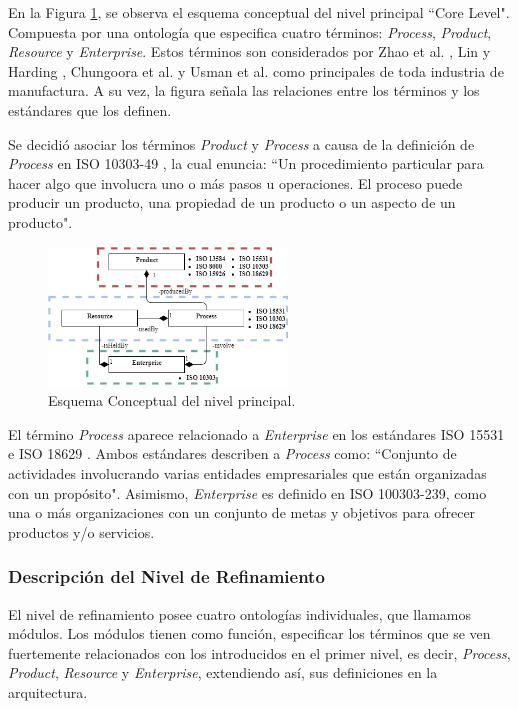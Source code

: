 \documentclass[journal]{IEEEtran}
\begin{document}
En la Figura \ref{fig3}, se observa el esquema conceptual del nivel principal ``Core Level". Compuesta por una ontolog\'ia que especifica cuatro t\'erminos: \emph{Process}, \emph{Product}, \emph{Resource} y \emph{Enterprise}. Estos t\'erminos son considerados por Zhao et al. \cite{Zhao1999}, Lin y Harding \cite{Lin2007},  Chungoora et al. \cite{Chungoora2013c} y Usman et al. \cite{Usman2013} como principales de toda industria de manufactura. A su vez, la figura señala las relaciones entre los t\'erminos y los est\'andares que los definen.

Se decidi\'o asociar los t\'erminos \emph{Product} y \emph{Process} a causa de la definici\'on de \emph{Process} en ISO 10303-49 \cite{ISOProperties}, la cual enuncia: ``Un procedimiento particular para hacer algo que involucra uno o m\'as pasos u operaciones. El proceso puede producir un producto, una propiedad de un producto o un aspecto de un producto". 

\begin{figure}[!t]
\centering
\includegraphics[width=2.5in]{figures/figure3.png}
\caption{Esquema Conceptual del nivel principal.}
\label{fig3}
\end{figure}

El t\'ermino \emph{Process} aparece relacionado a \emph{Enterprise} en los est\'andares ISO 15531 \cite{ISO2004} e ISO 18629 \cite{ISOPrinciplesc}. Ambos est\'andares describen a \emph{Process} como: ``Conjunto de actividades involucrando varias entidades empresariales que est\'an organizadas con un prop\'osito". Asimismo, \emph{Enterprise} es definido en ISO 100303-239, como una o m\'as organizaciones con un conjunto de metas y objetivos para ofrecer productos y/o servicios.

\subsubsection{Descripción del Nivel de Refinamiento}

El nivel de refinamiento posee cuatro ontolog\'ias individuales, que llamamos m\'odulos. Los m\'odulos tienen como funci\'on, especificar los t\'erminos que se ven fuertemente relacionados con los introducidos en el primer nivel, es decir, \emph{Process}, \emph{Product}, \emph{Resource} y \emph{Enterprise}, extendiendo as\'i, sus definiciones en la arquitectura.
\end{document}
